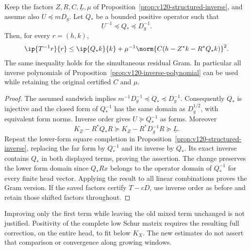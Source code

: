 \begin{proposition}
\label{prop:v122-refined-structured}
Keep the factors $Z,R,C,\underline L,\mu$ of
Proposition~\ref{prop:v120-structured-inverse}, and assume also
$U\preceq mD_g$. Let $Q_*$ be a bounded positive operator such
that
\[
 U^{-1}\preceq Q_*\preceq D_g^{-1}.
\]
Then, for every $r=(h,k)$,
\begin{equation}\label{eq:v122-refined-structured}
 \ip{T^{-1}r}{r}
 \le\ip{Q_*k}{k}
       +\mu^{-1}\norm{C(h-Z^*k-R^*Q_*k)}^2.
\end{equation}
The same inequality holds for the simultaneous residual Gram.
In particular all inverse polynomials of
Proposition~\ref{prop:v120-inverse-polynomial} can be used while
retaining the original certified $C$ and $\mu$.
\end{proposition}
\begin{proof}
The assumed sandwich implies
$m^{-1}D_g^{-1}\preceq Q_*\preceq D_g^{-1}$.
Consequently $Q_*$ is injective and the closed form of $Q_*^{-1}$
has the same domain as $D_g^{1/2}$, with equivalent form norms.
Inverse order gives $U\succeq Q_*^{-1}$ as forms. Moreover
\[
 K_Z-R^*Q_*R\succeq K_Z-R^*D_g^{-1}R\succeq\underline L.
\]
Repeat the lower-form square completion in
Proposition~\ref{prop:v120-structured-inverse}, replacing the far
form by $Q_*^{-1}$ and its inverse by $Q_*$. Its exact inverse
contains $Q_*$ in both displayed terms, proving the assertion.
The change preserves the lower form domain since $Q_*Rx$ belongs
to the operator domain of $Q_*^{-1}$ for every finite head vector.
Applying the result to all linear combinations proves the Gram
version. If the saved factors certify $T-cD$, use inverse order
as before and retain those shifted factors throughout.
\end{proof}

Improving only the first term while leaving the old mixed term
unchanged is not justified. Positivity of the complete low Schur
matrix requires the resulting full correction, on the entire head,
to fit below $K_X$. The new estimates do not assert that comparison
or convergence along growing windows.

